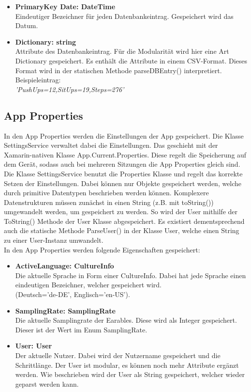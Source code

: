 \documentclass[a4paper,12pt]{article}
\begin{document}
\begin{itemize}
	\item \textbf{PrimaryKey Date: DateTime}\\Eindeutiger Bezeichner für jeden Datenbankeintrag. Gespeichert wird das Datum.
	\item \textbf{Dictionary: string}\\Attribute des Datenbankeintrag. Für die Modularität wird hier eine Art Dictionary gespeichert. Es enthält die Attribute in einem \gls{CSV}-Format. Dieses Format wird in der statischen Methode parseDBEntry() interpretiert. Beispieleintrag:\\ \textit{'PushUps=12,SitUps=19,Steps=276'}
\end{itemize}
 
\subsection{App Properties}
In den App Properties werden die Einstellungen der App gespeichert. Die Klasse SettingsService verwaltet dabei die Einstellungen. Das geschieht mit der Xamarin-nativen Klasse App.Current.Properties. Diese regelt die Speicherung auf dem Gerät, sodass auch bei mehreren Sitzungen die App Properties gleich sind.\\
Die Klasse SettingsService benutzt die Properties Klasse und regelt das korrekte Setzen der Einstellungen. Dabei können nur Objekte gespeichert werden, welche durch primitive Datentypen beschrieben werden können. Komplexere Datenstrukturen müssen zunächst in einen String (z.B. mit toString()) umgewandelt werden, um gespeichert zu werden. So wird der User mithilfe der ToString() Methode der User Klasse abgespeichert. Es existiert dementsprechend auch die statische Methode ParseUser() in der Klasse User, welche einen String zu einer User-Instanz umwandelt.
\\In den App Properties werden folgende Eigenschaften gespeichert:
\begin{itemize}
	\item \textbf{ActiveLanguage: CultureInfo}\\Die aktuelle Sprache in Form einer CultureInfo. Dabei hat jede Sprache einen eindeutigen Bezeichner, welcher gespeichert wird.\\ (Deutsch='de-DE', Englisch='en-US').
	\item \textbf{SamplingRate: SamplingRate}\\Die aktuelle Samplingrate der \Gls{Earables}. Diese wird als Integer gespeichert. Dieser ist der Wert im Enum SamplingRate.
	\item \textbf{User: User}\\Der aktuelle Nutzer. Dabei wird der Nutzername gespeichert und die Schrittlänge. Der User ist modular, es können noch mehr Attribute ergänzt werden.  Wie beschrieben wird der User als String gespeichert, welcher wieder geparst werden kann.
\end{itemize}
\end{document}
